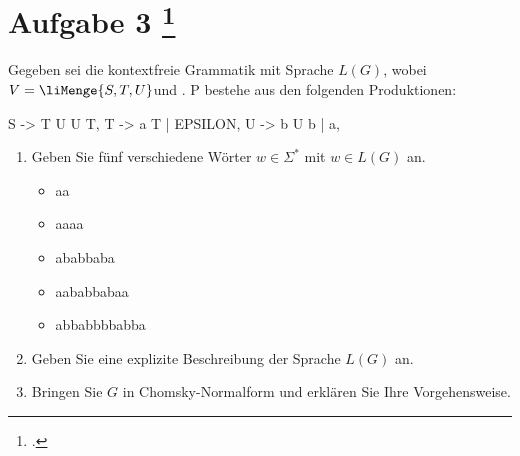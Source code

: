 \documentclass{lehramt-informatik-aufgabe}
\begin{document}
\liAufgabenTitel{}
\section{Aufgabe 3
\footcite{66115:2019:09}}

Gegeben sei die kontextfreie Grammatik \liGrammatik{} mit Sprache $L(G)$,
wobei $V = \liMenge{S,T,U} $und . P bestehe aus den folgenden
Produktionen:

\begin{liProduktionsRegeln}
S -> T U U T,
T -> a T | EPSILON,
U -> b U b | a,
\end{liProduktionsRegeln}
\begin{enumerate}


\item Geben Sie fünf verschiedene Wörter $w \in \Sigma^*$ mit $w \in
L(G)$ an.

\begin{liAntwort}
\begin{itemize}
\item aa
\item aaaa
\item ababbaba
\item aababbabaa
\item abbabbbbabba
\end{itemize}
\end{liAntwort}


\item Geben Sie eine explizite Beschreibung der Sprache $L(G)$ an.

\begin{liAntwort}


\end{liAntwort}


\item Bringen Sie $G$ in Chomsky-Normalform und erklären Sie Ihre
Vorgehensweise.

\end{enumerate}
\end{document}
